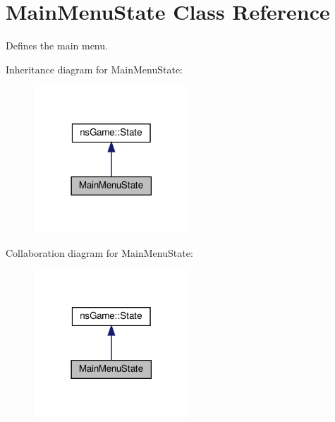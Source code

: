 \hypertarget{class_main_menu_state}{}\section{Main\+Menu\+State Class Reference}
\label{class_main_menu_state}


Defines the main menu.  




Inheritance diagram for Main\+Menu\+State\+:\nopagebreak
\begin{figure}[H]
\begin{center}
\leavevmode
\includegraphics[width=165pt]{class_main_menu_state__inherit__graph}
\end{center}
\end{figure}


Collaboration diagram for Main\+Menu\+State\+:\nopagebreak
\begin{figure}[H]
\begin{center}
\leavevmode
\includegraphics[width=165pt]{class_main_menu_state__coll__graph}
\end{center}
\end{figure}
